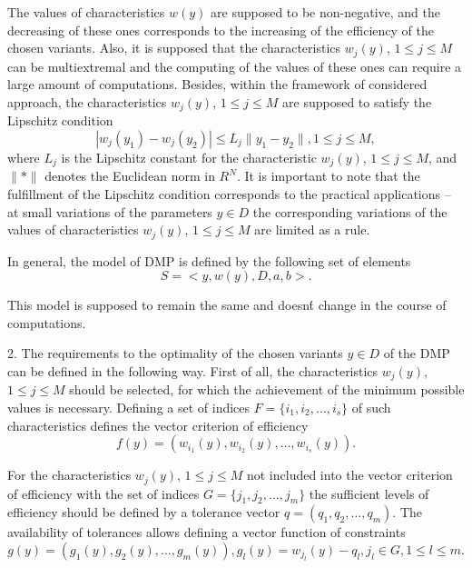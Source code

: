 \documentclass{svproc}
\begin{document}
The values of characteristics $w(y)$ are supposed to be non-negative, and the decreasing of these ones corresponds to the increasing of the efficiency of the chosen variants. Also, it is supposed that the characteristics $w_j (y)$, $1 \leq j \leq M$ can be multiextremal and the computing of the values of these ones can require a large amount of computations. Besides, within the framework of considered approach, the characteristics $w_j(y)$, $1 \leq j \leq M$ are supposed to satisfy the Lipschitz condition 
\begin{equation}
\label{eq:03}
|w_j(y_1) - w_j(y_2)| \leq L_j \|y_1-y_2\|, 1 \leq j \leq M,
\end{equation}
where $L_j$ is the Lipschitz constant for the characteristic $w_j(y)$, $1 \leq j \leq M$, and  $\|*\|$ denotes the Euclidean norm in $R^N$. It is important to note that the fulfillment of the Lipschitz condition corresponds to the practical applications -- at small variations of the parameters $y \in D$ the corresponding variations of the values of characteristics $w_j(y)$, $1 \leq j \leq M$ are limited as a rule.
 
In general, the model of DMP is defined by the following set of elements 
\begin{equation}
\label{eq:04}
S=<y,w(y),D,a,b>.
\end{equation}

This model is supposed to remain the same and doesn\'t change in the course of computations.

2. The requirements to the optimality of the chosen variants $y \in D$ of the DMP can be defined in the following way. First of all, the characteristics $w_j(y)$, $1 \leq j \leq M$ should be selected, for which the achievement of the minimum possible values is necessary. Defining a set of indices $F=\{ i_1,i_2, \dots ,i_s \}$ of such characteristics defines the vector criterion of efficiency 
\begin{equation}
\label{eq:05}
f(y)=(w_{i_1}(y),w_{i_2}(y),\dots,w_{i_s}(y)).
\end{equation}

For the characteristics $w_j(y)$, $1 \leq j \leq M$ not included into the vector criterion of efficiency with the set of indices $G=\{ j_1,j_2, \dots ,j_m\}$ the sufficient levels of efficiency should be defined by a tolerance vector $q=(q_1,q_2,\dots,q_m)$. The availability of tolerances allows defining a vector function of constraints 
\begin{equation}
\label{eq:06}
g(y)= (g_1(y),g_2(y),\dots,g_m (y)), g_l (y) = w_{j_l}(y) - q_l, j_l \in G, 1 \leq l \leq m.
\end{equation}
\end{document}
